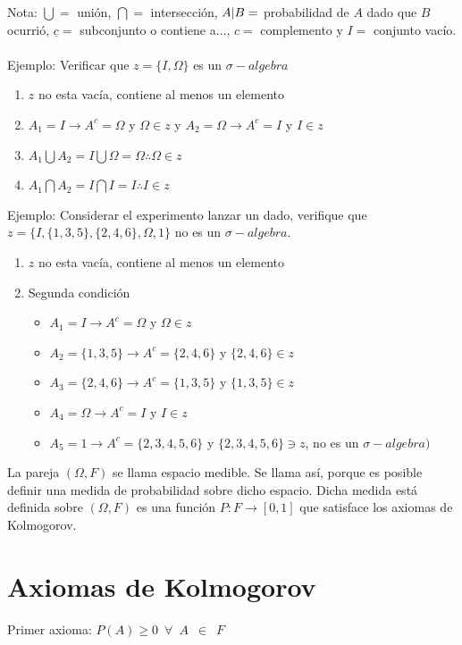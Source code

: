 \documentclass[11pt,fleqn]{book} %
\numberwithin{equation}{section} %
\numberwithin{figure}{section} %
\numberwithin{table}{section} %
\begin{document}
Nota:
$\bigcup =$ unión, $\bigcap =$ intersección, $A\arrowvert B =$ probabilidad de $A$ dado que $B$ ocurrió, $\underline{c} =$ subconjunto o contiene a..., $c =$ complemento y $I = $ conjunto vacío.
\ \\%
Ejemplo: Verificar que $z = \{ I, \Omega \}$ es un $\sigma-algebra$
\begin{enumerate}
    \item $z$ no esta vacía, contiene al menos un elemento
    \item $A_{1} = I \rightarrow A^{c} = \Omega$ y  $\Omega \in z$ y 
    $A_{2} = \Omega \rightarrow A^{c} = I$ y  $I \in z$
    \item $A_{1} \bigcup A_{2} = I \bigcup \Omega = \Omega \therefore \Omega \in z$
    \item $A_{1} \bigcap A_{2} = I \bigcap I = I \therefore I \in z$
\end{enumerate}
Ejemplo: Considerar el experimento lanzar un dado, verifique que $z = \{  I, \{1,3,5\},\{2,4,6\},\Omega,1 \}$ no es un $\sigma-algebra$.
\begin{enumerate}
    \item $z$ no esta vacía, contiene al menos un elemento
    \item Segunda condición
    \begin{itemize}
        \item $A_{1} = I \rightarrow A^{c} = \Omega$ y  $\Omega \in z$
        \item $A_{2} = \{1,3,5\} \rightarrow A^{c} = \{2,4,6\}$ y  $\{2,4,6\} \in z$
        \item $A_{3} = \{2,4,6\} \rightarrow A^{c} = \{1,3,5\}$ y  $\{1,3,5\} \in z$
        \item $A_{4} = \Omega \rightarrow A^{c} = I$ y  $I \in z$
        \item $A_{5} = 1 \rightarrow A^{c} = \{2,3,4,5,6\}$ y  $\{2,3,4,5,6\} \ni z$, no es un $\sigma-algebra)$
    \end{itemize}
\end{enumerate}
La pareja $(\Omega, F)$ se llama espacio medible. Se llama así, porque es posible definir una medida de probabilidad sobre dicho espacio. Dicha medida está definida sobre $(\Omega, F)$ es una función $P:F \to [0,1] $ que satisface los axiomas de Kolmogorov.
\section{Axiomas de Kolmogorov}
Primer axioma: $P(A) \geq   0  \enspace \forall \enspace A \enspace \in \enspace F$
\end{document}
